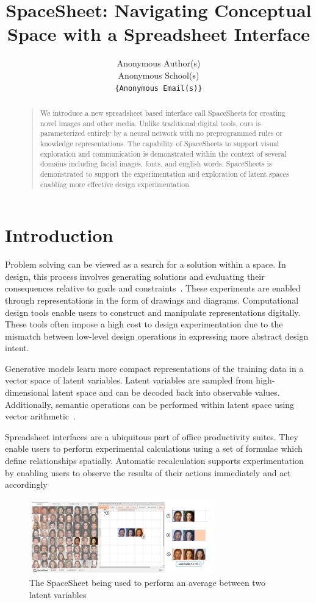 \documentclass[letterpaper]{article}
\title{SpaceSheet: Navigating Conceptual Space with a Spreadsheet Interface}
\author{
  Anonymous Author(s)\\
  Anonymous School(s)\\
  \texttt{\{Anonymous Email(s)\}} \\
}
\begin{document}
 
\maketitle
\begin{abstract}
\begin{quote}
We introduce a new spreadsheet based interface call SpaceSheets for creating novel images and other media. Unlike traditional digital tools, ours is parameterized entirely by a neural network with no preprogrammed rules or knowledge representations. The capability of SpaceSheets to support visual exploration and communication is demonstrated within the context of several domains including facial images, fonts, and english words. SpaceSheets is demonstrated to support the experimentation and exploration of latent spaces enabling more effective design experimentation.
\end{quote}
\end{abstract}

\section{Introduction}

Problem solving can be viewed as a search for a solution within a space. In design, this process involves generating solutions and evaluating their consequences relative to goals and constraints~\cite{simon95}. These experiments are enabled through representations in the form of drawings and diagrams. Computational design tools enable users to construct and manipulate representations digitally. These tools often impose a high cost to design experimentation due to the mismatch between low-level design operations in expressing more abstract design intent.

Generative models learn more compact representations of the training data in a vector space of latent variables. Latent variables are sampled from high-dimensional latent space and can be decoded back into observable values. Additionally, semantic operations can be performed within latent space using vector arithmetic~\cite{white16}.

Spreadsheet interfaces are a ubiquitous part of office productivity suites. They enable users to perform experimental calculations using a set of formulae which define relationships spatially. Automatic recalculation supports experimentation by enabling users to observe the results of their actions immediately and act accordingly

\begin{figure}[ht]
  \centering
  \includegraphics[width=8cm]{figs/01-hero-diagram.png}
  \caption{The SpaceSheet being used to perform an average between two latent variables}
\end{figure}
\end{document}
